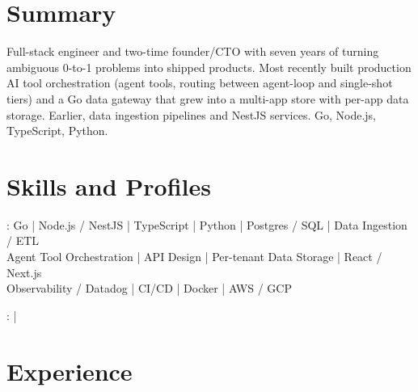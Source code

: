 \documentclass[print]{jack-resume}
\begin{document}
\pagecolor{darkmodeBackground}


\begin{minipage}[t][1cm][t]{.03\textwidth}
    \hfill
\end{minipage}

\section{Summary}
Full-stack engineer and two-time founder/CTO with seven years of turning ambiguous 0-to-1 problems into shipped products. Most recently built production AI tool orchestration (agent tools, routing between agent-loop and single-shot tiers) and a Go data gateway that grew into a multi-app store with per-app data storage. Earlier, data ingestion pipelines and NestJS services. Go, Node.js, TypeScript, Python.
\sectionsep

\section{Skills and Profiles}
:
Go \hfill | \hfill
Node.js / NestJS \hfill | \hfill
TypeScript \hfill | \hfill
Python \hfill | \hfill
Postgres / SQL \hfill | \hfill
Data Ingestion / ETL \\
\hspace{1.0cm} Agent Tool Orchestration \hfill | \hfill
API Design \hfill | \hfill
Per-tenant Data Storage \hfill | \hfill
React / Next.js \\
\hspace{1.0cm} Observability / Datadog \hfill | \hfill
CI/CD \hfill | \hfill
Docker \hfill | \hfill
AWS / GCP \\

\raggedright{
    :
      \href{https://www.linkedin.com/in/jack-sturtevant/}{ \ExternalLink} |
     \href{https://github.com/jacksturt}{ \ExternalLink}}

\section{Experience}
\end{document}
